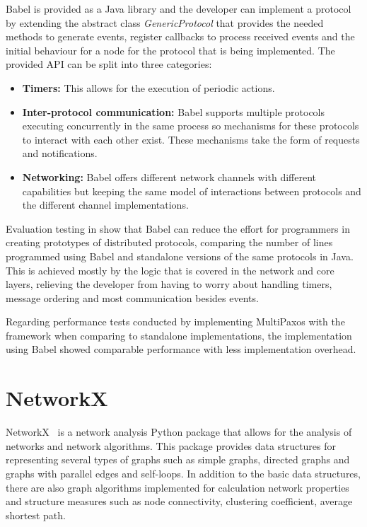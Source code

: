 Babel is provided as a Java library and the developer can implement a protocol
by extending the abstract class \textit{GenericProtocol} that provides the needed
methods to generate events, register callbacks to process received events and 
the initial behaviour for a node for the protocol that is being implemented.
The provided API can be split into three categories:

\begin{itemize}
  \item \textbf{Timers:} This allows for the execution of periodic actions.
  \item \textbf{Inter-protocol communication:} Babel supports multiple protocols
executing concurrently in the same process so mechanisms for these protocols
to interact with each other exist. These mechanisms take the form of requests and
notifications.
  \item \textbf{Networking:} Babel offers different network channels with different
capabilities but keeping the same model of interactions between protocols and the
different channel implementations.
\end{itemize}

Evaluation testing in \cite{babel} show that Babel can reduce the effort for programmers
in creating prototypes of distributed protocols, comparing the number of lines programmed
using Babel and standalone versions of the same protocols in Java. This is achieved
mostly by the logic that is covered in the network and core layers, relieving the developer
from having to worry about handling timers, message ordering and most communication besides events.

Regarding performance tests conducted by implementing MultiPaxos \cite{paxos} with the framework
when comparing to standalone implementations, the implementation using Babel showed comparable performance
with less implementation overhead.

\section{NetworkX}\label{sec:networkx}

NetworkX~\cite{networkx} is a network analysis Python package that allows for the analysis of
networks and network algorithms. This package provides data structures for representing
several types of graphs such as simple graphs, directed graphs and graphs with parallel
edges and self-loops. In addition to the basic data structures, there are also
graph algorithms implemented for calculation network properties and structure measures
such as node connectivity, clustering coefficient, average shortest path.

